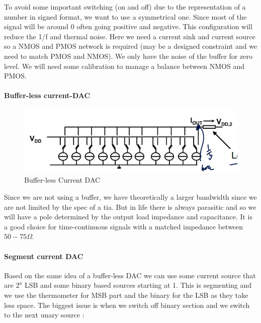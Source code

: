 \documentclass[
  a4paper,
]{article}
\begin{document}
To avoid some important switching (on and off) due to the representation
of a number in signed format, we want to use a symmetrical one. Since
most of the signal will be around 0 often going positive and negative.
This configuration will reduce the 1/f and thermal noise. Here we need a
current sink and current source so a NMOS and PMOS network is required
(may be a designed constraint and we need to match PMOS and NMOS). We
only have the noise of the buffer for zero level. We will need some
calibration to manage a balance between NMOS and PMOS.

\hypertarget{buffer-less-current-dac}{%
\paragraph{Buffer-less current-DAC}\label{buffer-less-current-dac}}

\begin{figure}
\hypertarget{fig:BLC-DAC-label}{%
\centering
\includegraphics{img/bufferless_current_dac.png}
\caption{Buffer-less Current DAC}\label{fig:BLC-DAC-label}
}
\end{figure}

Since we are not using a buffer, we have theoretically a larger
bandwidth since we are not limited by the spec of a {tia}. But in life
there is always parasitic and so we will have a pole determined by the
output load impedance and capacitance. It is a good choice for
time-continuous signals with a matched impedance between
\(50-75\Omega\).

\hypertarget{segment-current-dac}{%
\paragraph{Segment current DAC}\label{segment-current-dac}}

Based on the same idea of a buffer-less DAC we can use some current
source that are \(2^a\) LSB and some binary based sources starting at 1.
This is segmenting and we use the thermometer for MSB part and the
binary for the LSB as they take less space. The biggest issue is when we
switch off binary section and we switch to the next unary source :
\end{document}

